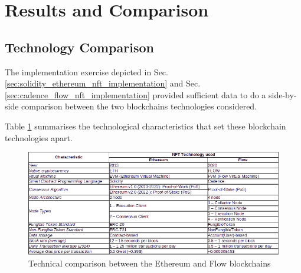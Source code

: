 \documentclass[../main.tex]{subfiles}
\begin{document}
\section{Results and Comparison}
\label{sec:results_and_comparison}

\subsection{Technology Comparison}
The implementation exercise depicted in Sec. \ref{sec:solidity_ethereum_nft_implementation} and Sec. \ref{sec:cadence_flow_nft_implementation} provided sufficient data to do a side-by-side comparison between the two blockchains technologies considered.
\par
Table \ref{fig:comparison_table} summarises the technological characteristics that set these blockchain technologies apart.

\begin{figure}[htp]
    \centering
    \includegraphics[width=1.0\textwidth]{../Images/10_Technology_Comparison.png}
    \caption{Technical comparison between the Ethereum and Flow blockchains}
    \label{fig:comparison_table}
\end{figure}
\end{document}
